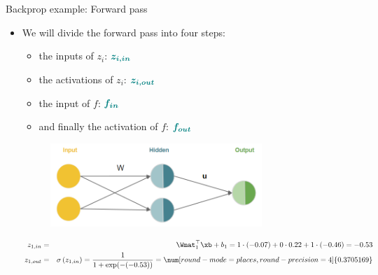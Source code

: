 \begin{vbframe}{Backprop example: Forward pass}

\begin{itemize}
\item We will divide the forward pass into four steps:
\begin{itemize}
\item the inputs of $z_i$: $\bm{\textcolor{teal}{z_{i,in}}}$
\item the activations of $z_i$: $\bm{\textcolor{teal}{z_{i,out}}}$
\item the input of $f$: $\bm{\textcolor{teal}{f_{in}}}$
\item and finally the activation of $f$: $\bm{\textcolor{teal}{f_{out}}}$
\end{itemize}
\begin{figure}
\centering
\includegraphics[width=8cm]{figure/xor_rep.png}
\end{figure}
\begin{figure}
\centering
{}
\end{figure}
\begin{footnotesize}
\begin{eqnarray*}
z_{1,in} &=& \Wmat_1^\top \xb + b_1 =  1 \cdot (-0.07) + 0 \cdot 0.22 + 1 \cdot (-0.46) = -0.53 \\
z_{1,out} &=& \sigma\left(z_{1,in}\right) = \frac{1}{1+\exp(-(-0.53))} = \num[round-mode=places,round-precision=4]{0.3705169}
\end{eqnarray*}
\end{footnotesize}
\end{itemize}
\framebreak


\end{vbframe}
